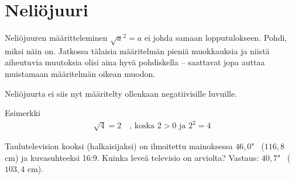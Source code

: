 \section{Neliöjuuri}


Neliöjuuren määritteleminen $\sqrt{a}^2=a$ ei johda samaan lopputulokseen. Pohdi, miksi näin on.
Jatkossa tälaisia määritelmän pieniä muokkauksia ja niistä aiheutuvia muutoksia olisi aina hyvä pohdiskella -- saattavat jopa auttaa muistamaan määritelmän oikean muodon.


Neliöjuurta ei siis nyt määritelty ollenkaan negatiivisille luvuille.


Esimerkki
\begin{align*}
\sqrt{4} = 2 \quad \textrm{, koska $2>0$ ja $2^2 =4$} 
\end{align*}

Taulutelevision kooksi (halkaisijaksi) on ilmoitettu mainoksessa $46,0$" \, ($116,8$ cm) ja kuvasuhteeksi 16:9. Kuinka leveä televisio on arviolta?
Vastaus: $40,7$" \, ($103,4$ cm).

